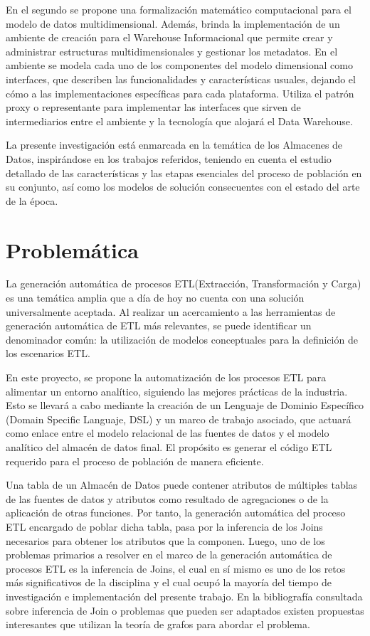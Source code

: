 En el segundo se propone una formalización matemático computacional para el modelo de datos multidimensional. Además,
brinda la implementación de un ambiente de creación para el Warehouse Informacional que permite crear y administrar 
estructuras multidimensionales y gestionar los metadatos. En el ambiente se modela cada uno de los componentes del modelo 
dimensional como interfaces, que describen las funcionalidades y caracter\'isticas usuales, dejando el c\'omo a las 
implementaciones 
espec\'ificas para cada plataforma. Utiliza el patr\'on proxy o representante para implementar 
las interfaces que sirven de intermediarios entre el ambiente y la tecnología que alojar\'a el Data Warehouse.

La presente investigaci\'on est\'a enmarcada en la tem\'atica de los Almacenes de Datos, inspir\'andose en los trabajos 
referidos, teniendo en cuenta el estudio detallado de las características y  las etapas esenciales del proceso de 
población en su conjunto, así como los modelos de solución consecuentes con el estado del arte de la época.


\section{Problem\'atica}

La generaci\'on autom\'atica de procesos ETL(Extracción, Transformación y Carga) es una tem\'atica amplia que a d\'ia de hoy no cuenta con una soluci\'on 
universalmente aceptada. Al realizar un acercamiento a las herramientas de generación automática de ETL más relevantes, se puede
identificar un denominador común: la utilización de modelos conceptuales para la definición de los
escenarios ETL.

En este proyecto, se propone la automatización de los procesos ETL para alimentar un entorno analítico, siguiendo 
las mejores prácticas de la industria. Esto se llevará a cabo mediante la creación de un Lenguaje de Dominio 
Específico (Domain Specific Languaje, DSL) y un marco de trabajo asociado, que actuará como enlace entre el modelo relacional de las fuentes 
de datos y el modelo analítico del almacén de datos final. El propósito es generar el código ETL requerido para el 
proceso de población de manera eficiente.

Una tabla de un Almacén de Datos puede contener atributos de m\'ultiples tablas de las fuentes de datos y 
atributos como resultado de agregaciones o de la aplicaci\'on de otras funciones. Por tanto, la generaci\'on autom\'atica 
del proceso ETL encargado de poblar dicha tabla, pasa por la inferencia de los Joins necesarios para obtener los atributos 
que la componen. Luego, uno de los problemas primarios a resolver en 
el marco de la generaci\'on autom\'atica de procesos ETL es la inferencia de Joins, el cual en s\'i mismo es uno de 
los retos m\'as significativos de la disciplina y el cual ocup\'o la mayor\'ia del tiempo de investigación e implementación 
del presente trabajo. En la bibliografía consultada sobre inferencia de Join o problemas que pueden ser adaptados existen 
propuestas interesantes que utilizan la teor\'ia de grafos para abordar el problema. 

